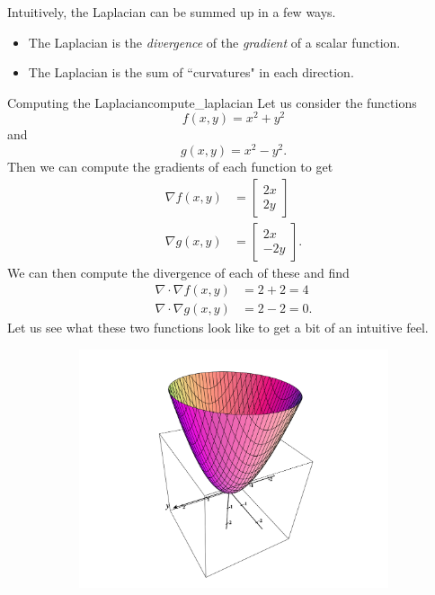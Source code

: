         Intuitively, the Laplacian can be summed up in a few ways. 
        \begin{itemize}
            \item The Laplacian is the \emph{divergence} of the \emph{gradient} of a scalar function.
            \item The Laplacian is the sum of ``curvatures" in each direction.
        \end{itemize}
        
        \begin{ex}{Computing the Laplacian}{compute_laplacian}
        Let us consider the functions
        \[
        f(x,y) = x^2+y^2
        \]
        and
        \[
        g(x,y) = x^2-y^2.
        \]
        Then we can compute the gradients of each function to get
        \begin{align*}
            \nabla f(x,y) &= \begin{bmatrix} 2x \\ 2y \end{bmatrix}\\
            \nabla g(x,y) &= \begin{bmatrix} 2x \\ -2y \end{bmatrix}.
        \end{align*}
        We can then compute the divergence of each of these and find
        \begin{align*}
            \nabla \cdot \nabla f(x,y) &= 2+2 = 4\\
            \nabla \cdot \nabla g(x,y) &= 2-2 =0.
        \end{align*}
        Let us see what these two functions look like to get a bit of an intuitive feel.
        \begin{figure}[H]
            \centering
            \begin{subfigure}[h]{.45\textwidth}
            \includegraphics[width=\textwidth]{Figures/pos_laplace.png}

\end{subfigure}
\end{figure}
\end{ex}
